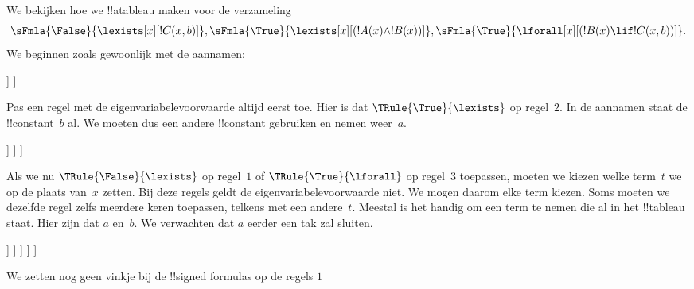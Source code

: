\documentclass[openany]{memoir}
\begin{document}
\begin{ex}
We bekijken hoe we !!a{tableau} maken voor de verzameling
\[
\sFmla{\False}{\lexists[x][!C(x,b)]},
\sFmla{\True}{\lexists[x][(!A(x) \land !B(x))]},
\sFmla{\True}{\lforall[x][(!B(x) \lif !C(x,b))]}.
\]
We beginnen zoals gewoonlijk met de aannamen:
\begin{oltableau}
  [\sFmla{\False}{\lexists[x][\formula{C}(x,b)]}, just=\TAss
    [\sFmla{\True}{\lexists[x][(\formula{A}(x) \land \formula{B}(x))]},
      just=\TAss
      [\sFmla{\True}{\lforall[x][(\formula{B}(x) \lif \formula{C}(x,b))]},
        just=\TAss]
    ]
  ]
\end{oltableau}
Pas een regel met de eigenvariabelevoorwaarde altijd eerst toe. Hier is
dat $\TRule{\True}{\lexists}$ op regel~$2$. In de aannamen staat de
!!{constant}~$b$ al. We moeten dus een andere !!{constant} gebruiken en
nemen weer~$a$.
\begin{oltableau}
  [\sFmla{\False}{\lexists[x][\formula{C}(x,b)]}, just=\TAss
    [\sFmla{\True}{\lexists[x][(\formula{A}(x) \land \formula{B}(x))]},
      just=\TAss, checked
      [\sFmla{\True}{\lforall[x][(\formula{B}(x) \lif \formula{C}(x,b))]},
        just=\TAss
        [\sFmla{\True}{\formula{A}(a) \land \formula{B}(a)},
          just={\TRule{\True}{\lexists}[2]}]
      ]
    ]
  ]
\end{oltableau}
Als we nu $\TRule{\False}{\lexists}$ op regel~$1$ of
$\TRule{\True}{\lforall}$ op regel~$3$ toepassen, moeten we kiezen welke
term~$t$ we op de plaats van~$x$ zetten. Bij deze regels geldt de
eigenvariabelevoorwaarde niet. We mogen daarom elke term kiezen. Soms
moeten we dezelfde regel zelfs meerdere keren toepassen, telkens met
een andere~$t$. Meestal is het handig om een term te nemen die al in het
!!{tableau} staat. Hier zijn dat $a$ en~$b$. We verwachten dat $a$
eerder een tak zal sluiten.
\begin{oltableau}
  [\sFmla{\False}{\lexists[x][\formula{C}(x,b)]}, just=\TAss
    [\sFmla{\True}{\lexists[x][(\formula{A}(x) \land \formula{B}(x))]},
      just=\TAss, checked
      [\sFmla{\True}{\lforall[x][(\formula{B}(x) \lif \formula{C}(x,b))]}, just=\TAss
        [\sFmla{\True}{\formula{A}(a) \land \formula{B}(a)}, just={\TRule{\True}{\lexists}[2]}
          [\sFmla{\False}{\formula{C}(a,b)}, just={\TRule{\False}{\lexists}[1]}
            [\sFmla{\True}{\formula{B}(a) \lif \formula{C}(a,b)},
              just={\TRule{\True}{\lforall}[3]}
            ]
          ]
        ]
      ]
    ]
  ]
\end{oltableau}
We zetten nog geen vinkje bij de !!{signed formula}s op de regels $1$

\end{ex}
\end{document}
